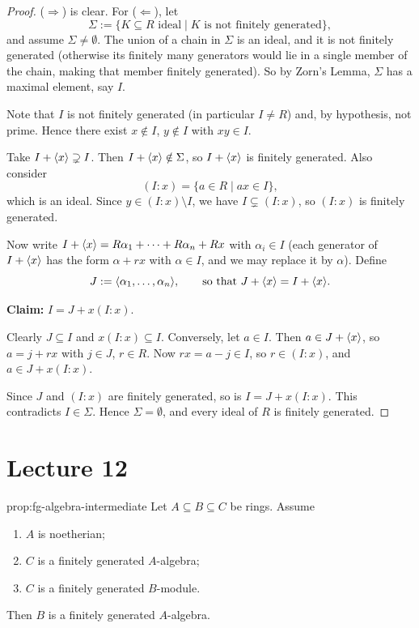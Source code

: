 \begin{proof}
($\Rightarrow$) is clear. For ($\Leftarrow$), let
\[
\Sigma := \{K \subseteq R \text{ ideal} \mid K \text{ is not finitely generated}\},
\]
and assume $\Sigma \neq \emptyset$. The union of a chain in $\Sigma$ is an ideal, and it is not finitely generated (otherwise its finitely many generators would lie in a single member of the chain, making that member finitely generated). So by Zorn's Lemma, $\Sigma$ has a maximal element, say $I$.

Note that $I$ is not finitely generated (in particular $I \neq R$) and, by hypothesis, not prime. Hence there exist $x \notin I$, $y \notin I$ with $xy \in I$.

Take $I + \langle x \rangle \supsetneq I$. Then $I + \langle x \rangle \notin \Sigma$, so $I + \langle x \rangle$ is finitely generated. Also consider
\[
(I : x) = \{a \in R \mid ax \in I\},
\]
which is an ideal. Since $y \in (I:x) \setminus I$, we have $I \subsetneq (I : x)$, so $(I:x)$ is finitely generated.

Now write $I + \langle x \rangle = R\alpha_1 + \cdots + R\alpha_n + Rx$ with $\alpha_i \in I$ (each generator of $I + \langle x \rangle$ has the form $\alpha + rx$ with $\alpha \in I$, and we may replace it by $\alpha$). Define
\[
J := \langle \alpha_1, \ldots, \alpha_n \rangle, \qquad \text{so that } J + \langle x \rangle = I + \langle x \rangle.
\]

\textbf{Claim:} $I = J + x(I : x)$.

Clearly $J \subseteq I$ and $x(I:x) \subseteq I$. Conversely, let $a \in I$. Then $a \in J + \langle x \rangle$, so $a = j + rx$ with $j \in J$, $r \in R$. Now $rx = a - j \in I$, so $r \in (I : x)$, and $a \in J + x(I:x)$.

Since $J$ and $(I:x)$ are finitely generated, so is $I = J + x(I:x)$. This contradicts $I \in \Sigma$. Hence $\Sigma = \emptyset$, and every ideal of $R$ is finitely generated.
\end{proof}

\section{Lecture 12}

\begin{proposition}{}{prop:fg-algebra-intermediate}
Let $A \subseteq B \subseteq C$ be rings. Assume
\begin{enumerate}[label=(\arabic*)]
    \item $A$ is noetherian;
    \item $C$ is a finitely generated $A$-algebra;
    \item $C$ is a finitely generated $B$-module.
\end{enumerate}
Then $B$ is a finitely generated $A$-algebra.
\end{proposition}

